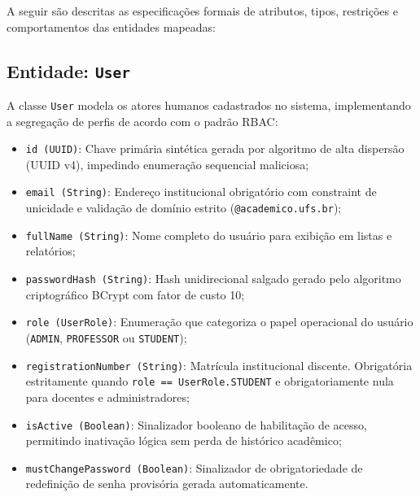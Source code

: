 A seguir são descritas as especificações formais de atributos, tipos, restrições e comportamentos das entidades mapeadas:

\subsection{Entidade: \texttt{User}}
A classe \texttt{User} modela os atores humanos cadastrados no sistema, implementando a segregação de perfis de acordo com o padrão RBAC:
\begin{itemize}
    \item \texttt{id (UUID)}: Chave primária sintética gerada por algoritmo de alta dispersão (UUID v4), impedindo enumeração sequencial maliciosa;
    \item \texttt{email (String)}: Endereço institucional obrigatório com constraint de unicidade e validação de domínio estrito (\texttt{@academico.ufs.br});
    \item \texttt{fullName (String)}: Nome completo do usuário para exibição em listas e relatórios;
    \item \texttt{passwordHash (String)}: Hash unidirecional salgado gerado pelo algoritmo criptográfico BCrypt com fator de custo 10;
    \item \texttt{role (UserRole)}: Enumeração que categoriza o papel operacional do usuário (\texttt{ADMIN}, \texttt{PROFESSOR} ou \texttt{STUDENT});
    \item \texttt{registrationNumber (String)}: Matrícula institucional discente. Obrigatória estritamente quando \texttt{role == UserRole.STUDENT} e obrigatoriamente nula para docentes e administradores;
    \item \texttt{isActive (Boolean)}: Sinalizador booleano de habilitação de acesso, permitindo inativação lógica sem perda de histórico acadêmico;
    \item \texttt{mustChangePassword (Boolean)}: Sinalizador de obrigatoriedade de redefinição de senha provisória gerada automaticamente.
\end{itemize}


